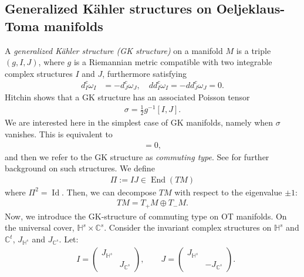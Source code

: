 \documentclass[12pt]{amsart}
\numberwithin{equation}{section}
\numberwithin{prop}{section}
\theoremstyle{definition}
\newcommand{\gs}{\sigma}
\begin{document}
%
%
\subsection{Generalized K\"ahler structures on Oeljeklaus-Toma manifolds}
%
%

A \textit{generalized K\"ahler structure (GK structure)} \cite{GHR,GualtieriGKG} on a manifold $M$ is a triple $(g,I, J)$, where $g$ is a Riemannian metric compatible with two integrable complex structures $I$ and $J$, furthermore satisfying
    \begin{align*}
        d_I^c \omega_I &= -d_J^c\omega_J, \quad dd_I^c\omega_I = -dd_J^c\omega_J=0.
    \end{align*}
Hitchin \cite{HitchinPoisson} shows that a GK structure has an associated Poisson tensor
\begin{align*}
    \gs = \tfrac{1}{2} g^{-1} [I, J].
\end{align*}
We are interested here in the simplest case of GK manifolds, namely when $\gs$ vanishes.  This is equivalent to
    \begin{align*}
        [I, J]=0,
    \end{align*}
    and then we refer to the GK structure as \emph{commuting type}.  See \cite{ApostolovGualtieri} for further background on such structures.  We define
    \begin{align*}
        \Pi:= IJ \in \operatorname{End}(TM)
    \end{align*}
    where $\Pi^2=\operatorname{Id}$. Then, we can decompose $TM$ with respect to the eigenvalue $\pm 1$:
    \begin{align*}
        TM=T_+M\oplus T_-M.
    \end{align*}    
    Now, we introduce the GK-structure of commuting type on OT manifolds. On the universal cover, $\mathbb{H}^s\times\mathbb{C}^s$. Consider the invariant complex structures on $\mathbb{H}^s$ and $\mathbb{C}^t$, $J_{\mathbb{H}^s}$ and $J_{\mathbb{C}^s}$.  Let:
    \begin{align*}
        &I=\left (
        \begin{aligned}
            J_{\mathbb{H}^s} &  \\
            & J_{\mathbb{C}^s}
        \end{aligned}
        \right ),
        \qquad J=\left (
        \begin{aligned}
            J_{\mathbb{H}^s} &  \\
            & -J_{\mathbb{C}^s}
        \end{aligned}
        \right ).
    \end{align*}
\end{document}
